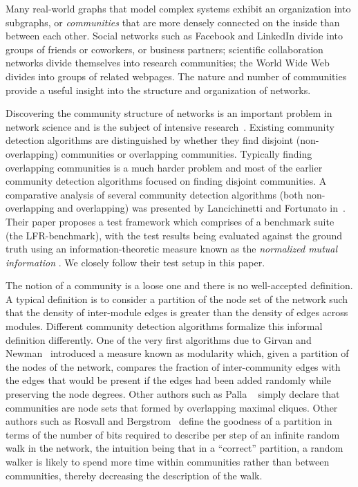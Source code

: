 Many real-world graphs that model complex systems exhibit an organization 
into subgraphs, or \textit{communities} that are more densely connected on the inside than between each other. 
Social networks such as Facebook and LinkedIn divide into groups of friends 
or coworkers, or business partners; scientific collaboration networks divide 
themselves into research communities; the World Wide Web divides into groups 
of related webpages. The nature and number of communities provide 
a useful insight into the structure and organization of networks. 

Discovering the community structure of networks is an 
important problem in network science and is the subject 
of intensive research~\cite{GN02, GN04, CNM04, RCC04, DM04, PDFV05, NL07, 
BGLL08, RB08, RN09}. Existing community detection algorithms are 
distinguished by whether they find disjoint (non-overlapping) 
communities or overlapping communities. Typically finding 
overlapping communities is a much harder problem and most of the 
earlier community detection algorithms focused on finding disjoint 
communities. A comparative analysis of several community detection algorithms 
(both non-overlapping and overlapping) was presented by Lancichinetti and Fortunato 
in~\cite{LF09}. Their paper proposes a test framework which comprises of a 
benchmark suite (the LFR-benchmark), with the test results being evaluated against 
the ground truth using an information-theoretic measure known as the \emph{normalized 
mutual information} \cite{AL09}. We closely follow their test setup in this paper. 


The notion of a community is a loose one and there is no well-accepted definition.
A typical definition is to consider a partition of the node set of the network 
such that the density of inter-module edges is greater than the density of edges 
across modules. Different community detection algorithms formalize this informal 
definition differently. One of the very first algorithms due to 
Girvan and Newman~\cite{GN02} introduced a measure known as modularity 
which, given a partition of the nodes of the network, compares the fraction of 
inter-community edges with the edges that would be present if the edges had been 
added randomly while preserving the node degrees. Other authors such as Palla 
\etal~\cite{PDFV05} simply declare that communities are node sets that formed 
by overlapping maximal cliques. Other authors such as Rosvall and Bergstrom~\cite{RB08} 
define the goodness of a partition in terms of the number of bits required to 
describe per step of an infinite random walk in the network, the intuition being 
that in a ``correct'' partition, a random walker is likely to spend more time 
within communities rather than between communities, thereby decreasing the 
description of the walk.  


